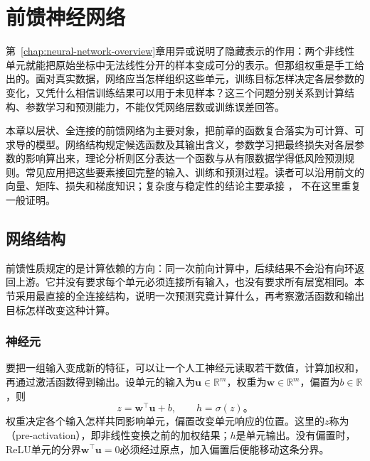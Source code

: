 \chapter{前馈神经网络}
\label{chap:feedforward-networks}

第~\ref{chap:neural-network-overview}章用异或说明了隐藏表示的作用：两个非线性单元就能把原始坐标中无法线性分开的样本变成可分的表示。但那组权重是手工给出的。面对真实数据，网络应当怎样组织这些单元，训练目标怎样决定各层参数的变化，又凭什么相信训练结果可以用于未见样本？这三个问题分别关系到计算结构、参数学习和预测能力，不能仅凭网络层数或训练误差回答。

本章以层状、全连接的前馈网络为主要对象，把前章的函数复合落实为可计算、可求导的模型。网络结构规定候选函数及其输出含义，参数学习把最终损失对各层参数的影响算出来，理论分析则区分表达一个函数与从有限数据学得低风险预测规则。常见应用把这些要素接回完整的输入、训练和预测过程。读者可以沿用前文的向量、矩阵、损失和梯度知识；复杂度与稳定性的结论主要承接
，
不在这里重复一般证明。

\section{网络结构}
\label{sec:ffn-structure}

前馈性质规定的是计算依赖的方向：同一次前向计算中，后续结果不会沿有向环返回上游。它并没有要求每个单元必须连接所有输入，也没有要求所有层宽相同。本节采用最直接的全连接结构，说明一次预测究竟计算什么，再考察激活函数和输出目标怎样改变这种计算。

\subsection{神经元}
\label{sec:ffn-neuron}

要把一组输入变成新的特征，可以让一个人工神经元读取若干数值，计算加权和，再通过激活函数得到输出。设单元的输入为$\bm{u}\in\mathbb{R}^{m}$，权重为$\bm{w}\in\mathbb{R}^{m}$，偏置为$b\in\mathbb{R}$，则
\begin{equation}
  z=\bm{w}^{\top}\bm{u}+b,
  \qquad h=\sigma(z)\text{。}
  \label{eq:ffn-unit}
\end{equation}
权重决定各个输入怎样共同影响单元，偏置改变单元响应的位置。这里的$z$称为（pre-activation），即非线性变换之前的加权结果；$h$是单元输出。没有偏置时，ReLU单元的分界$\bm{w}^{\top}\bm{u}=0$必须经过原点，加入偏置后便能移动这条分界。

